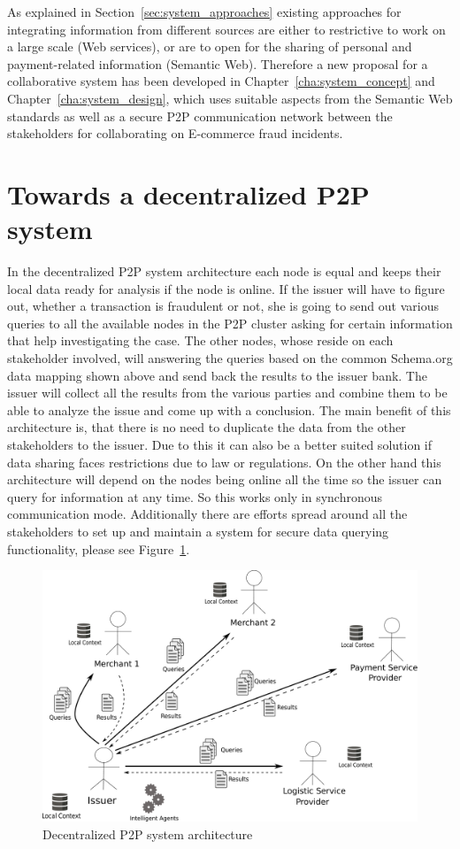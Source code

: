 As explained in Section~\ref{sec:system_approaches} existing approaches for integrating information from different sources are either to restrictive to work on a large scale (Web services), or are to open for the sharing of personal and payment-related information (Semantic Web). Therefore a new proposal for a collaborative system has been developed in Chapter~\ref{cha:system_concept} and Chapter~\ref{cha:system_design}, which uses suitable aspects from the Semantic Web standards as well as a secure \gls{P2P} communication network between the stakeholders for collaborating on \gls{E-commerce} fraud incidents. \\

\section{Towards a decentralized \gls{P2P} system}
\label{sec:p2p_decentralized_system}

In the decentralized P2P system architecture each node is equal and keeps their local data ready for analysis if the node is online. If the issuer will have to figure out, whether a transaction is fraudulent or not, she is going to send out various queries to all the available nodes in the P2P cluster asking for certain information that help investigating the case. The other nodes, whose reside on each stakeholder involved, will answering the queries based on the common Schema.org data mapping shown above and send back the results to the issuer bank. The issuer will collect all the results from the various parties and combine them to be able to analyze the issue and come up with a conclusion. The main benefit of this architecture is, that there is no need to duplicate the data from the other stakeholders to the issuer. Due to this it can also be a better suited solution if data sharing faces restrictions due to law or regulations. On the other hand this architecture will depend on the nodes being online all the time so the issuer can query for information at any time. So this works only in synchronous communication mode. Additionally there are efforts spread around all the stakeholders to set up and maintain a system for secure data querying functionality, please see Figure~\ref{fig:images_p2p_decentralized}.

\begin{figure}[H]
	\centering
		\includegraphics[width=0.9\columnwidth]{images/system_P2P_decentralized.pdf}
	\caption{Decentralized \gls{P2P} system architecture}
\label{fig:images_p2p_decentralized}
\end{figure}


